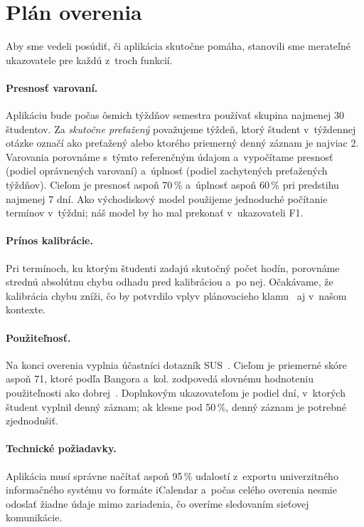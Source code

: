 \documentclass[10pt,twoside,slovak,a4paper]{article}
\begin{document}
\section{Plán overenia} \label{s:overenie}

Aby sme vedeli posúdiť, či aplikácia skutočne pomáha, stanovili sme
merateľné ukazovatele pre každú z~troch funkcií.

\paragraph{Presnosť varovaní.}
Aplikáciu bude počas ôsmich týždňov semestra používať skupina najmenej
30 študentov. Za \emph{skutočne preťažený} považujeme týždeň, ktorý študent
v~týždennej otázke označí ako preťažený alebo ktorého priemerný denný záznam
je najviac 2. Varovania porovnáme s~týmto referenčným údajom a~vypočítame
presnosť (podiel oprávnených varovaní) a~úplnosť (podiel zachytených
preťažených týždňov). Cieľom je presnosť aspoň 70\,\% a~úplnosť aspoň
60\,\% pri predstihu najmenej 7 dní. Ako východiskový model použijeme
jednoduché počítanie termínov v~týždni; náš model by ho mal prekonať
v~ukazovateli F1.

\paragraph{Prínos kalibrácie.}
Pri termínoch, ku ktorým študenti zadajú skutočný počet hodín, porovnáme
strednú absolútnu chybu odhadu pred kalibráciou a~po nej. Očakávame, že
kalibrácia chybu zníži, čo by potvrdilo vplyv plánovacieho
klamu~\cite{Buehler:Planning} aj v~našom kontexte.

\paragraph{Použiteľnosť.}
Na konci overenia vyplnia účastníci dotazník SUS~\cite{Brooke:SUS}. Cieľom
je priemerné skóre aspoň 71, ktoré podľa Bangora a~kol. zodpovedá slovnému
hodnoteniu použiteľnosti ako dobrej~\cite{Bangor:SUS}. Doplnkovým ukazovateľom je podiel dní,
v~ktorých študent vyplnil denný záznam; ak klesne pod 50\,\%, denný záznam
je potrebné zjednodušiť.

\paragraph{Technické požiadavky.}
Aplikácia musí správne načítať aspoň 95\,\% udalostí z~exportu
univerzitného informačného systému vo formáte iCalendar a~počas celého
overenia nesmie odoslať žiadne údaje mimo zariadenia, čo overíme
sledovaním sieťovej komunikácie.
\end{document}
